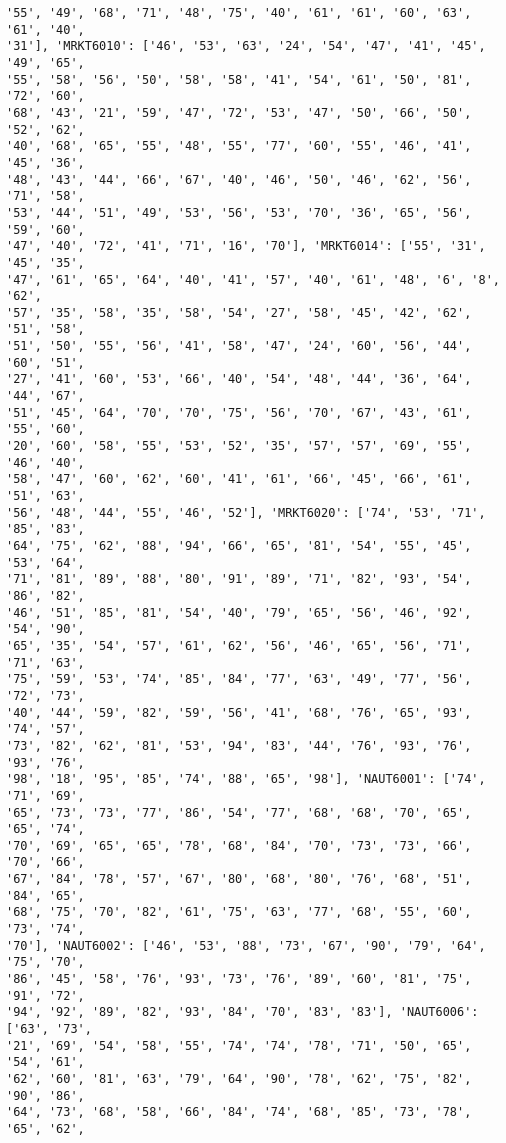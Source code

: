 \documentclass[11pt]{article}
\begin{document}
\begin{Verbatim}[commandchars=\\\{\}]
'55', '49', '68', '71', '48', '75', '40', '61', '61', '60', '63', '61', '40',
'31'], 'MRKT6010': ['46', '53', '63', '24', '54', '47', '41', '45', '49', '65',
'55', '58', '56', '50', '58', '58', '41', '54', '61', '50', '81', '72', '60',
'68', '43', '21', '59', '47', '72', '53', '47', '50', '66', '50', '52', '62',
'40', '68', '65', '55', '48', '55', '77', '60', '55', '46', '41', '45', '36',
'48', '43', '44', '66', '67', '40', '46', '50', '46', '62', '56', '71', '58',
'53', '44', '51', '49', '53', '56', '53', '70', '36', '65', '56', '59', '60',
'47', '40', '72', '41', '71', '16', '70'], 'MRKT6014': ['55', '31', '45', '35',
'47', '61', '65', '64', '40', '41', '57', '40', '61', '48', '6', '8', '62',
'57', '35', '58', '35', '58', '54', '27', '58', '45', '42', '62', '51', '58',
'51', '50', '55', '56', '41', '58', '47', '24', '60', '56', '44', '60', '51',
'27', '41', '60', '53', '66', '40', '54', '48', '44', '36', '64', '44', '67',
'51', '45', '64', '70', '70', '75', '56', '70', '67', '43', '61', '55', '60',
'20', '60', '58', '55', '53', '52', '35', '57', '57', '69', '55', '46', '40',
'58', '47', '60', '62', '60', '41', '61', '66', '45', '66', '61', '51', '63',
'56', '48', '44', '55', '46', '52'], 'MRKT6020': ['74', '53', '71', '85', '83',
'64', '75', '62', '88', '94', '66', '65', '81', '54', '55', '45', '53', '64',
'71', '81', '89', '88', '80', '91', '89', '71', '82', '93', '54', '86', '82',
'46', '51', '85', '81', '54', '40', '79', '65', '56', '46', '92', '54', '90',
'65', '35', '54', '57', '61', '62', '56', '46', '65', '56', '71', '71', '63',
'75', '59', '53', '74', '85', '84', '77', '63', '49', '77', '56', '72', '73',
'40', '44', '59', '82', '59', '56', '41', '68', '76', '65', '93', '74', '57',
'73', '82', '62', '81', '53', '94', '83', '44', '76', '93', '76', '93', '76',
'98', '18', '95', '85', '74', '88', '65', '98'], 'NAUT6001': ['74', '71', '69',
'65', '73', '73', '77', '86', '54', '77', '68', '68', '70', '65', '65', '74',
'70', '69', '65', '65', '78', '68', '84', '70', '73', '73', '66', '70', '66',
'67', '84', '78', '57', '67', '80', '68', '80', '76', '68', '51', '84', '65',
'68', '75', '70', '82', '61', '75', '63', '77', '68', '55', '60', '73', '74',
'70'], 'NAUT6002': ['46', '53', '88', '73', '67', '90', '79', '64', '75', '70',
'86', '45', '58', '76', '93', '73', '76', '89', '60', '81', '75', '91', '72',
'94', '92', '89', '82', '93', '84', '70', '83', '83'], 'NAUT6006': ['63', '73',
'21', '69', '54', '58', '55', '74', '74', '78', '71', '50', '65', '54', '61',
'62', '60', '81', '63', '79', '64', '90', '78', '62', '75', '82', '90', '86',
'64', '73', '68', '58', '66', '84', '74', '68', '85', '73', '78', '65', '62',

\end{Verbatim}
\end{document}
